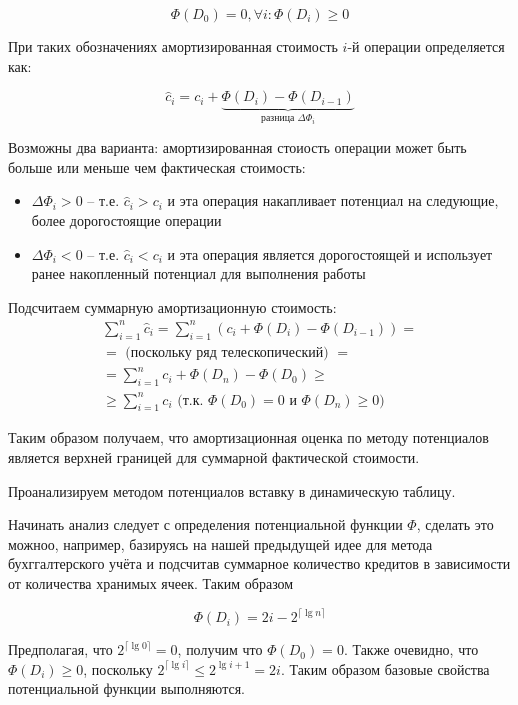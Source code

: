 \documentclass[a4paper,11pt]{article}
\begin{document}
$$
\Phi(D_0) = 0, \forall i: \Phi(D_i) \geqslant 0
$$

При таких обозначениях амортизированная стоимость $i$-й операции определяется
как:

$$
\hat{c}_i = c_i + \underbrace{\Phi(D_i) - \Phi(D_{i-1})}_{\text{разница } \Delta \Phi_i}
$$

Возможны два варианта: амортизированная стоиость операции может быть больше или
меньше чем фактическая стоимость:

\begin{itemize}
\item $\Delta \Phi_i > 0$ -- т.е. $\hat{c}_i > c_i$ и эта операция накапливает
  потенциал на следующие, более дорогостоящие операции
\item $\Delta \Phi_i < 0$ -- т.е. $\hat{c}_i < c_i$ и эта операция является
  дорогостоящей и использует ранее накопленный потенциал для выполнения работы
\end{itemize}

Подсчитаем суммарную амортизационную стоимость:
\begin{gather*}
\sum_{i=1}^n \hat{c}_i = \sum_{i=1}^n (c_i + \Phi(D_i) - \Phi(D_{i-1})) = \\
= \text{ (поскольку ряд телескопический) } = \\
= \sum_{i=1}^n c_i + \Phi(D_n) - \Phi(D_0) \geqslant \\
\geqslant \sum_{i=1}^n c_i \text{ (т.к. } \Phi(D_0) = 0 \text { и } \Phi(D_n)
\geqslant 0 \text{) }
\end{gather*}

Таким образом получаем, что амортизационная оценка по методу потенциалов
является верхней границей для суммарной фактической стоимости.

Проанализируем методом потенциалов вставку в динамическую таблицу.

Начинать анализ следует с определения потенциальной функции $\Phi$, сделать это
можноо, например, базируясь на нашей предыдущей идее для метода бухггалтерского
учёта и подсчитав суммарное количество кредитов в зависимости от количества
хранимых ячеек. Таким образом

$$
\Phi(D_i) = 2i - 2^{\lceil \lg n \rceil}
$$

Предполагая, что $2^{\lceil \lg 0 \rceil} = 0$, получим что $\Phi(D_0) = 0$.
Также очевидно, что $\Phi(D_i) \geqslant 0$, поскольку $2^{\lceil \lg i \rceil}
\leqslant 2^{\lg i + 1} = 2i$. Таким образом базовые свойства потенциальной
функции выполняются. 
\end{document}
